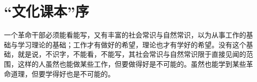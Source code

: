 \section[ “文化课本”序（一九四一年）]{ “文化课本”序}


一个革命干部必须能看能写，又有丰富的社会常识与自然常识，以为从事工作的基础与学习理论的基础；工作才有做好的希望，理论也才有学好的希望。没有这个基础，就是说，不识字，不能看，不能写，其社会常识与自然常识限于直接见闻的范围，这样的人虽然也能做某些工作，但要做得好是不可能的。虽然也能学到某些革命道理，但要学得好也是不可能的。

